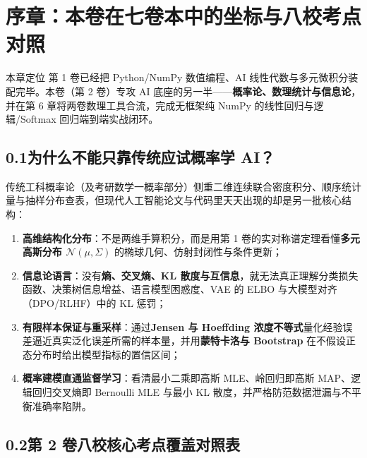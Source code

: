 \chapter*{序章：本卷在七卷本中的坐标与八校考点对照}

\begin{chapIntro}{本章定位}
第 1 卷已经把 Python/NumPy 数值编程、AI 线性代数与多元微积分装配完毕。本卷（第 2 卷）专攻 AI 底座的另一半——\textbf{概率论、数理统计与信息论}，并在第 6 章将两卷数理工具合流，完成无框架纯 NumPy 的线性回归与逻辑/Softmax 回归端到端实战闭环。
\end{chapIntro}

\section*{0.1\quad 为什么不能只靠传统应试概率学 AI？}

传统工科概率论（及考研数学一概率部分）侧重二维连续联合密度积分、顺序统计量与抽样分布查表，但现代人工智能论文与代码里天天出现的却是另一批核心结构：
\begin{enumerate}
  \item \textbf{高维结构化分布}：不是两维手算积分，而是用第 1 卷的实对称谱定理看懂\textbf{多元高斯分布 $\mathcal{N}(\mu,\Sigma)$} 的椭球几何、仿射封闭性与条件更新；
  \item \textbf{信息论语言}：没有\textbf{熵、交叉熵、KL 散度与互信息}，就无法真正理解分类损失函数、决策树信息增益、语言模型困惑度、VAE 的 ELBO 与大模型对齐（DPO/RLHF）中的 KL 惩罚；
  \item \textbf{有限样本保证与重采样}：通过\textbf{Jensen 与 Hoeffding 浓度不等式}量化经验误差逼近真实泛化误差所需的样本量，并用\textbf{蒙特卡洛与 Bootstrap} 在不假设正态分布时给出模型指标的置信区间；
  \item \textbf{概率建模直通监督学习}：看清最小二乘即高斯 MLE、岭回归即高斯 MAP、逻辑回归交叉熵即 Bernoulli MLE 与最小 KL 散度，并严格防范数据泄漏与不平衡准确率陷阱。
\end{enumerate}

\section*{0.2\quad 第 2 卷八校核心考点覆盖对照表}

